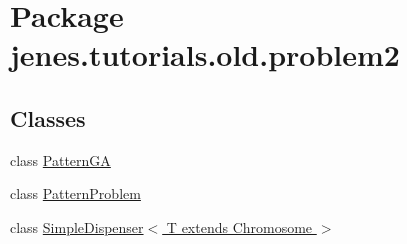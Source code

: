 \hypertarget{namespacejenes_1_1tutorials_1_1old_1_1problem2}{\section{Package jenes.\-tutorials.\-old.\-problem2}
\label{namespacejenes_1_1tutorials_1_1old_1_1problem2}
}
\subsection*{Classes}
\begin{DoxyCompactItemize}
\item 
class \hyperlink{classjenes_1_1tutorials_1_1old_1_1problem2_1_1_pattern_g_a}{Pattern\-G\-A}
\item 
class \hyperlink{classjenes_1_1tutorials_1_1old_1_1problem2_1_1_pattern_problem}{Pattern\-Problem}
\item 
class \hyperlink{classjenes_1_1tutorials_1_1old_1_1problem2_1_1_simple_dispenser_3_01_t_01extends_01_chromosome_01_4}{Simple\-Dispenser$<$ T extends Chromosome $>$}
\end{DoxyCompactItemize}
